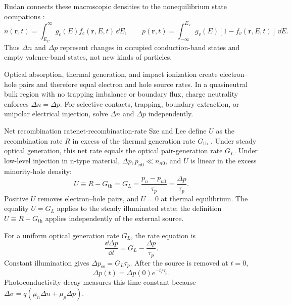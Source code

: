 Rudan connects these macroscopic densities to the nonequilibrium state
occupations \cite[Sec.~20.2, Eqs.~(20.3)--(20.4)]{rudan2015}:
\[
  n(\bm r,t)=\int_{E_C}^{\infty}g_c(E)f_c(\bm r,E,t)\,\dd E,
  \qquad
  p(\bm r,t)=\int_{-\infty}^{E_V}g_v(E)
  [1-f_v(\bm r,E,t)]\,\dd E.
\]
Thus $\Delta n$ and $\Delta p$ represent changes in occupied conduction-band
states and empty valence-band states, not new kinds of particles.

Optical absorption, thermal generation, and impact ionization create
electron--hole pairs and therefore equal electron and hole source rates.  In a
quasineutral bulk region with no trapping imbalance or boundary flux, charge
neutrality enforces $\Delta n=\Delta p$.  For selective contacts, trapping,
boundary extraction, or unipolar electrical injection, solve $\Delta n$ and
$\Delta p$ independently.

\begin{definition}{Net recombination rate}{net-recombination-rate}
Sze and Lee define $U$ as the recombination rate $R$ in excess of the thermal
generation rate $G_{\mathrm{th}}$ \cite[Sec.~2.3.1,
Eqs.~(39)--(44)]{szeLee2012}.  Under steady optical generation, this net rate
equals the optical pair-generation rate $G_L$.  Under low-level injection in
n-type material, $\Delta p,p_{n0}\ll n_{n0}$, and $U$ is linear in the excess
minority-hole density:
\begin{equation}
  \boxed{
  U\equiv R-G_{\mathrm{th}}=G_L
  =\frac{p_n-p_{n0}}{\tau_p}
  =\frac{\Delta p}{\tau_p}.
  }
  \label{eq:minority-lifetime-model}
\end{equation}
Positive $U$ removes electron--hole pairs, and $U=0$ at thermal equilibrium.
The equality $U=G_L$ applies to the steady illuminated state; the definition
$U\equiv R-G_{\mathrm{th}}$ applies independently of the external source.
\end{definition}

For a uniform optical generation rate $G_L$, the rate equation is
\begin{equation}
  \frac{\dd\Delta p}{\dd t}=G_L-\frac{\Delta p}{\tau_p}.
  \label{eq:uniform-excess-rate}
\end{equation}
Constant illumination gives $\Delta p_{\mathrm{ss}}=G_L\tau_p$.  After the
source is removed at $t=0$,
\begin{equation}
  \boxed{\Delta p(t)=\Delta p(0)e^{-t/\tau_p}.}
  \label{eq:minority-lifetime-decay}
\end{equation}
Photoconductivity decay measures this time constant because
$\Delta\sigma=q(\mu_n\Delta n+\mu_p\Delta p)$.

